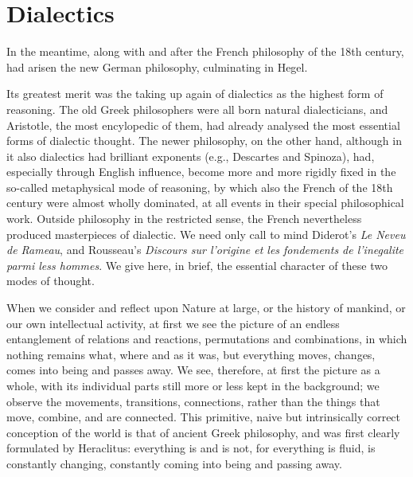 \chapter{Dialectics}

In the meantime, along with and after the French philosophy of the 18th century,
had arisen the new German philosophy, culminating in Hegel.

Its greatest merit was the taking up again of dialectics as the highest form of
reasoning. The old Greek philosophers were all born natural dialecticians, and
Aristotle, the most encylopedic of them, had already analysed the most essential
forms of dialectic thought. The newer philosophy, on the other hand, although in
it also dialectics had brilliant exponents (e.g., Descartes and Spinoza), had,
especially through English influence, become more and more rigidly fixed in the
so-called metaphysical mode of reasoning, by which also the French of the 18th
century were almost wholly dominated, at all events in their special
philosophical work. Outside philosophy in the restricted sense, the French
nevertheless produced masterpieces of dialectic. We need only call to mind
Diderot's \emph{Le Neveu de Rameau}, and Rousseau's \emph{Discours sur l'origine
et les fondements de l'inegalite parmi less hommes}. We give here, in brief, the
essential character of these two modes of thought.

When we consider and reflect upon Nature at large, or the history of mankind, or
our own intellectual activity, at first we see the picture of an endless
entanglement of relations and reactions, permutations and combinations, in which
nothing remains what, where and as it was, but everything moves, changes, comes
into being and passes away. We see, therefore, at first the picture as a whole,
with its individual parts still more or less kept in the background; we observe
the movements, transitions, connections, rather than the things that move,
combine, and are connected. This primitive, naive but intrinsically correct
conception of the world is that of ancient Greek philosophy, and was first
clearly formulated by Heraclitus: everything is and is not, for everything is
fluid, is constantly changing, constantly coming into being and passing
away.

